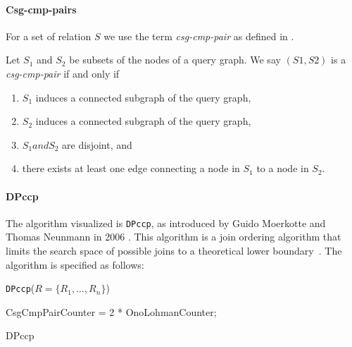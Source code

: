 \paragraph{Csg-cmp-pairs}
For a set of relation $S$ we use the term \textit{csg-cmp-pair} as defined in \cite{moerkotte2006analysis}.
\begin{definition}
    Let $S_1$ and $S_2$ be subsets of the nodes of a query graph. We say $(S1, S2)$ is a \textit{csg-cmp-pair} if and only if
    \begin{enumerate}
        \item $S_1$ induces a connected subgraph of the query graph,
        \item $S_2$ induces a connected subgraph of the query graph,
        \item $S_1 and S_2$ are disjoint, and
        \item there exists at least one edge connecting a node in $S_1$ to a node in $S_2$.
    \end{enumerate}
\end{definition}

\paragraph{DPccp}
The algorithm visualized is \texttt{DPccp}, as introduced by Guido Moerkotte and Thomas Neunmann in 2006 \cite{moerkotte2006analysis}. This algorithm is a join ordering algorithm that limits the search space of possible joins to a theoretical lower boundary \cite{moerkotte2009building}. 
The algorithm is specified as follows:

\vspace{0.5cm}
\texttt{DPccp}($R = \{R_1, \ldots, R_n\}$)
\begin{algorithm}
\BlankLine
{}
CsgCmpPairCounter = 2 * OnoLohmanCounter;\\
\vspace{0.5cm}
\caption{DPccp}
\end{algorithm}

